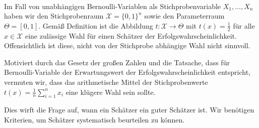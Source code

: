\begin{bsp}  \\
    Im Fall von unabhängigen \gls{Bernoulli-Variable}n als \gls{Stichprobenvariable} $X_1,\dots,X_n$ haben wir den \gls{Stichprobenraum} $\mathcal X=\{0,1\}^n$ sowie den Parameterraum $\Theta=[0,1]$.
    Gemäß Definition ist die Abbildung $t:\mathcal X\to\Theta$ mit $t(x)=\frac12$ für alle $x\in\mathcal X$ eine zulässige Wahl für einen \gls{Schätzer} der Erfolgswahrscheinlichkeit.
    Offensichtlich ist diese, nicht von der Stichprobe abhängige Wahl nicht sinnvoll.

    Motiviert durch das Gesetz der großen Zahlen und die Tatsache, dass für \gls{Bernoulli-Variable} der Erwartungswert der Erfolgswahrscheinlichkeit entspricht, vermuten wir, dass das arithmetische Mittel der Stichprobenwerte $t(x)=\frac1n\sum_{i=1}^n x_i$ eine klügere Wahl sein sollte.

    Dies wirft die Frage auf, wann ein \gls{Schätzer} ein guter \gls{Schätzer} ist.
    Wir benötigen Kriterien, um \gls{Schätzer} systematisch beurteilen zu können.
\end{bsp}

